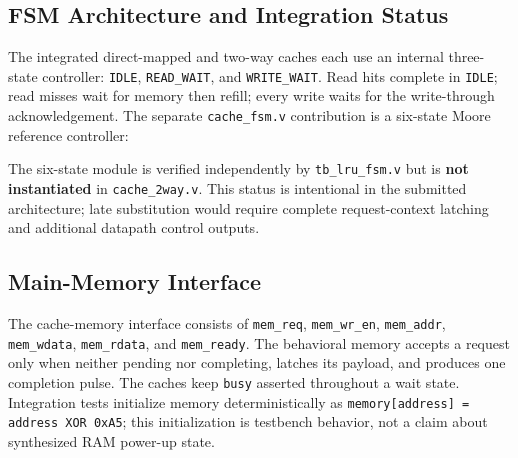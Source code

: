 \documentclass[10pt,twocolumn]{article}
\begin{document}
\subsection{FSM Architecture and Integration Status}
The integrated direct-mapped and two-way caches each use an internal three-state controller: \texttt{IDLE}, \texttt{READ\_WAIT}, and \texttt{WRITE\_WAIT}. Read hits complete in \texttt{IDLE}; read misses wait for memory then refill; every write waits for the write-through acknowledgement. The separate \texttt{cache\_fsm.v} contribution is a six-state Moore reference controller:

\begin{center}
\end{center}

The six-state module is verified independently by \texttt{tb\_lru\_fsm.v} but is \textbf{not instantiated} in \texttt{cache\_2way.v}. This status is intentional in the submitted architecture; late substitution would require complete request-context latching and additional datapath control outputs.

\subsection{Main-Memory Interface}
The cache-memory interface consists of \texttt{mem\_req}, \texttt{mem\_wr\_en}, \texttt{mem\_addr}, \texttt{mem\_wdata}, \texttt{mem\_rdata}, and \texttt{mem\_ready}. The behavioral memory accepts a request only when neither pending nor completing, latches its payload, and produces one completion pulse. The caches keep \texttt{busy} asserted throughout a wait state. Integration tests initialize memory deterministically as \texttt{memory[address] = address XOR 0xA5}; this initialization is testbench behavior, not a claim about synthesized RAM power-up state.
\end{document}
